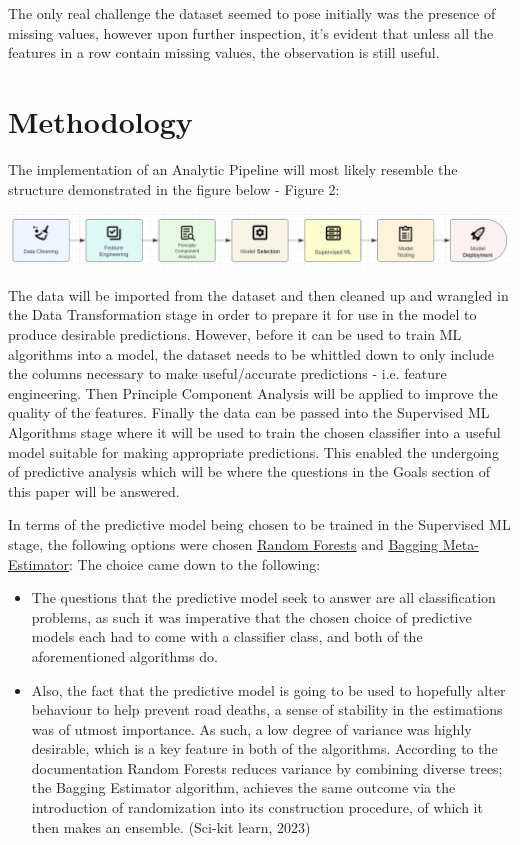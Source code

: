 \documentclass[12pt, a4paper]{article}
\begin{document}
The only real challenge the dataset seemed to pose initially was the presence of missing values, however upon further inspection, it's evident that unless all the features in a row contain missing values, the observation is still useful.

\section*{Methodology}
The implementation of an Analytic Pipeline will most likely resemble the structure demonstrated in the figure below - Figure 2: 
\begin{center}
    \includegraphics[width=\linewidth]{Analytic Pipeline.png}
    \label{fig:analytic-pipeline}
\end{center}
The data will be imported from the dataset and then cleaned up and wrangled in the Data Transformation stage in order to prepare it for use in the model to produce desirable predictions. However, before it can be used to train ML algorithms into a model, the dataset needs to be whittled down to only include the columns necessary to make useful/accurate predictions - i.e. feature engineering. Then Principle Component Analysis will be applied to improve the quality of the features. Finally the data can be passed into the Supervised ML Algorithms stage where it will be used to train the chosen classifier into a useful model suitable for making appropriate predictions. This enabled the undergoing of predictive analysis which will be where the questions in the Goals section of this paper will be answered. 

In terms of the predictive model being chosen to be trained in the Supervised ML stage, the following options were chosen \href{https://scikit-learn.org/stable/modules/ensemble.html#random-forests-and-other-randomized-tree-ensembles}{Random Forests} and \href{https://scikit-learn.org/stable/modules/ensemble.html#bagging-meta-estimator}{Bagging Meta-Estimator}:
The choice came down to the following: 
\begin{itemize}
    \item The questions that the predictive model seek to answer are all classification problems, as such it was imperative that the chosen choice of predictive models each had to come with a classifier class, and both of the aforementioned algorithms do.
    \item Also, the fact that the predictive model is going to be used to hopefully alter behaviour to help prevent road deaths, a sense of stability in the estimations was of utmost importance. As such, a low degree of variance was highly desirable, which is a key feature in both of the algorithms. According to the documentation Random Forests reduces variance by combining diverse trees; the Bagging Estimator algorithm, achieves the same outcome via the introduction of  randomization into its construction procedure, of which it then makes an ensemble. (Sci-kit learn, 2023)
\end{itemize}
\end{document}
